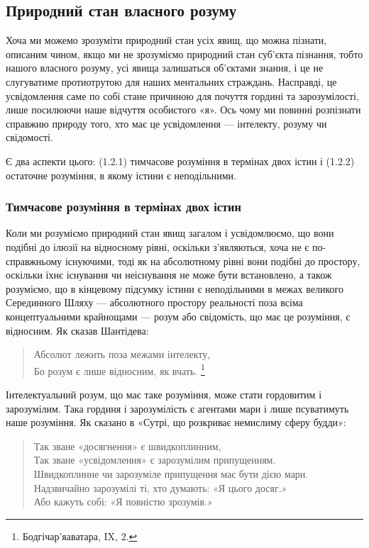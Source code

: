 \documentclass{article}
\begin{document}
\subsection{Природний стан власного розуму}

Хоча ми можемо зрозуміти природний стан усіх явищ, що можна пізнати,
описаним чином, якщо ми не зрозуміємо природний стан суб'єкта пізнання,
тобто нашого власного розуму, усі явища залишаться об'єктами знання,
і це не слугуватиме протиотрутою для наших ментальних страждань.
Насправді, це усвідомлення саме по собі стане причиною для почуття
гордині та зарозумілості, лише посилюючи наше відчуття особистого «я».
Ось чому ми повинні розпізнати справжню природу того,
хто має це усвідомлення — інтелекту, розуму чи свідомості.

Є два аспекти цього:
(1.2.1) тимчасове розуміння в термінах двох істин і
(1.2.2) остаточне розуміння, в якому істини є неподільними.

\subsubsection{Тимчасове розуміння в термінах двох істин}

Коли ми розуміємо природний стан явищ загалом і усвідомлюємо, що вони подібні до ілюзії на відносному рівні, оскільки з’являються, хоча не є по-справжньому існуючими, тоді як на абсолютному рівні вони подібні до простору, оскільки їхнє існування чи неіснування не може бути встановлено, а також розуміємо, що в кінцевому підсумку істини є неподільними в межах великого Серединного Шляху — абсолютного простору реальності поза всіма концептуальними крайнощами — розум або свідомість, що має це розуміння, є відносним. Як сказав Шантідева:

\begin{verse}
        Абсолют лежить поза межами інтелекту, \\
        Бо розум є лише відносним, як вчать. \footnote{Бодгічар’яаватара, IX, 2.}
\end{verse}

Інтелектуальний розум, що має таке розуміння, може стати гордовитим і зарозумілим. Така гординя і зарозумілість є агентами мари і лише псуватимуть наше розуміння. Як сказано в «Сутрі, що розкриває немислиму сферу будди»:

\begin{verse}
        Так зване «досягнення» є швидкоплинним, \\
        Так зване «усвідомлення» є зарозумілим припущенням. \\
        Швидкоплинне чи зарозуміле припущення має бути дією мари. \\
        Надзвичайно зарозумілі ті, хто думають: «Я цього досяг.» \\
        Або кажуть собі: «Я повністю зрозумів.»
\end{verse}
\end{document}
